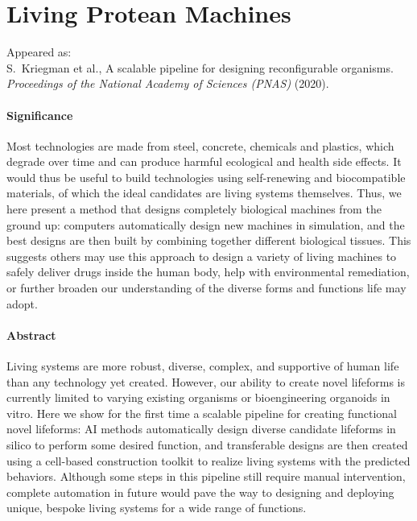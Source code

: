 
\chapter{Living Protean Machines}
\vspace{-2em}
\vspace{1em}
{\footnotesize
\noindent
Appeared as:\\
S.~Kriegman et al., A scalable pipeline for designing reconfigurable organisms. 
\textit{Proceedings of the National Academy of Sciences (PNAS)} (2020).
}


\subsubsection*{Significance}

Most technologies are made from steel, concrete, chemicals and plastics, which degrade over time and can produce harmful ecological and health side effects. It would thus be useful to build technologies using self-renewing and biocompatible materials, of which the ideal candidates are living systems themselves. Thus, we here present a method that designs completely biological machines from the ground up: computers automatically design new machines in simulation, and the best designs are then built by combining together different biological tissues. This suggests others may use this approach to design a variety of living machines to safely deliver drugs inside the human body, help with environmental remediation, or further broaden our understanding of the diverse forms and functions life may adopt.


\subsubsection*{Abstract} 

Living systems are more robust, diverse, complex, and supportive of human life than any technology yet created. However, our ability to create novel lifeforms is currently limited to varying existing organisms or bioengineering organoids in vitro. Here we show for the first time a scalable pipeline for creating functional novel lifeforms: AI methods automatically design diverse candidate lifeforms in silico to perform some desired function, and transferable designs are then created using a cell-based construction toolkit to realize living systems with the predicted behaviors. Although some steps in this pipeline still require manual intervention, complete automation in future would pave the way to designing and deploying unique, bespoke living systems for a wide range of functions.


